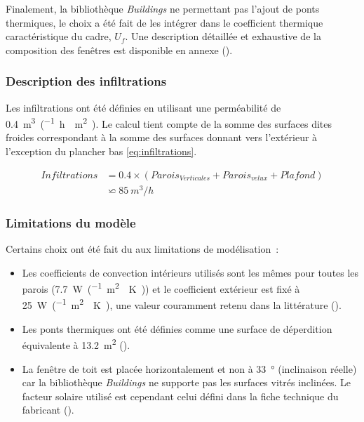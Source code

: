 Finalement, la bibliothèque \textit{Buildings} ne permettant pas l’ajout de ponts
thermiques, le choix a été fait de les intégrer dans le coefficient thermique
caractéristique du cadre, $U_{f}$. Une description détaillée et exhaustive de la
composition des fenêtres est disponible en annexe ().


\subsubsection{Description des infiltrations} %
\label{ssub:description_des_infiltrations}
Les infiltrations ont été définies en utilisant une perméabilité de
\SI{0.4}{m^{3}\per(\hour\period\meter\squared)}. Le calcul tient compte de la
somme des surfaces dites froides correspondant à la somme des surfaces donnant
vers l’extérieur à l’exception du plancher bas \eqref{eq:infiltrations}.

\begin{align}
    Infiltrations &= 0.4 \times (Parois_{Verticales} + Parois_{velux} + Plafond)\\
    &              \backsimeq \SI{85}{m^{3}/h}
    \label{eq:infiltrations}
\end{align}


\subsubsection{Limitations du modèle} %
\label{ssub:limitations_du_modele}
Certains choix ont été fait du aux limitations de modélisation~:
\begin{itemize}
    \item Les coefficients de convection intérieurs utilisés sont les mêmes pour toutes
          les parois (\SI{7.7}{\watt\per(\meter\squared\period\kelvin)}) et le coefficient extérieur
          est fixé à \SI{25}{\watt\per(\meter\squared\period\kelvin)}, une valeur couramment retenu
          dans la littérature ().
    \item Les ponts thermiques ont été définies comme une surface de déperdition
          équivalente à \SI{13.2}{\meter\squared} ().
    \item La fenêtre de toit est placée horizontalement et non à \SI{33}{\degree}
          (inclinaison réelle) car la bibliothèque \textit{Buildings} ne supporte pas les
          surfaces vitrés inclinées. Le facteur solaire utilisé est cependant celui défini
          dans la fiche technique du fabricant ().
\end{itemize}


